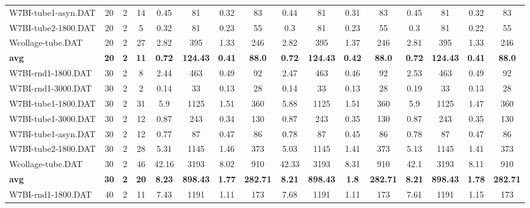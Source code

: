 \begin{sidewaystable}[!ht]
{\begin{tabular}{lccccccccccccccc}
W7BI-tube1-asyn.DAT & 20 & 2 & 14 & 0.45 & 81 & 0.32 & 83 & 0.44 & 81 &  \textcolor{blue2}{0.31} & 83 & 0.45 & 81 & 0.32 & 83 \\
W7BI-tube2-1800.DAT & 20 & 2 & 5 & 0.32 & 81 & 0.23 & 55 & 0.3 & 81 & 0.23 & 55 & 0.3 & 81 &  \textcolor{blue2}{0.22} & 55 \\
Wcollage-tube.DAT & 20 & 2 & 27 & 2.82 & 395 &  \textcolor{blue2}{1.33} & 246 & 2.82 & 395 & 1.37 & 246 & 2.81 & 395 &  \textcolor{blue2}{1.33} & 246 \\
\cline{1-16} \textbf{avg} & \textbf{20} & \textbf{2} & \textbf{11} & \textbf{0.72} & \textbf{124.43} & \textbf{0.41} & \textbf{88.0} & \textbf{0.72} & \textbf{124.43} & \textbf{0.42} & \textbf{88.0} & \textbf{0.72} & \textbf{124.43} & \textbf{0.41} & \textbf{88.0} \\ \cline{1-16}
W7BI-rnd1-1800.DAT & 30 & 2 & 8 & 2.44 & 463 & 0.49 & 92 & 2.47 & 463 &  \textcolor{blue2}{0.46} & 92 & 2.53 & 463 & 0.49 & 92 \\
W7BI-rnd1-3000.DAT & 30 & 2 & 2 & 0.14 & 33 &  \textcolor{blue2}{0.13} & 28 & 0.14 & 33 &  \textcolor{blue2}{0.13} & 28 & 0.19 & 33 &  \textcolor{blue2}{0.13} & 28 \\
W7BI-tube1-1800.DAT & 30 & 2 & 31 & 5.9 & 1125 & 1.51 & 360 & 5.88 & 1125 & 1.51 & 360 & 5.9 & 1125 &  \textcolor{blue2}{1.47} & 360 \\
W7BI-tube1-3000.DAT & 30 & 2 & 12 & 0.87 & 243 &  \textcolor{blue2}{0.34} & 130 & 0.87 & 243 & 0.35 & 130 & 0.87 & 243 & 0.35 & 130 \\
W7BI-tube1-asyn.DAT & 30 & 2 & 12 & 0.77 & 87 & 0.47 & 86 & 0.78 & 87 &  \textcolor{blue2}{0.45} & 86 & 0.78 & 87 & 0.47 & 86 \\
W7BI-tube2-1800.DAT & 30 & 2 & 28 & 5.31 & 1145 & 1.46 & 373 & 5.03 & 1145 &  \textcolor{blue2}{1.41} & 373 & 5.13 & 1145 &  \textcolor{blue2}{1.41} & 373 \\
Wcollage-tube.DAT & 30 & 2 & 46 & 42.16 & 3193 &  \textcolor{blue2}{8.02} & 910 & 42.33 & 3193 & 8.31 & 910 & 42.1 & 3193 & 8.11 & 910 \\
\cline{1-16} \textbf{avg} & \textbf{30} & \textbf{2} & \textbf{20} & \textbf{8.23} & \textbf{898.43} & \textbf{1.77} & \textbf{282.71} & \textbf{8.21} & \textbf{898.43} & \textbf{1.8} & \textbf{282.71} & \textbf{8.21} & \textbf{898.43} & \textbf{1.78} & \textbf{282.71} \\ \cline{1-16}
W7BI-rnd1-1800.DAT & 40 & 2 & 11 & 7.43 & 1191 &  \textcolor{blue2}{1.11} & 173 & 7.68 & 1191 &  \textcolor{blue2}{1.11} & 173 & 7.61 & 1191 & 1.15 & 173 \\

\end{tabular}}
\end{sidewaystable}
